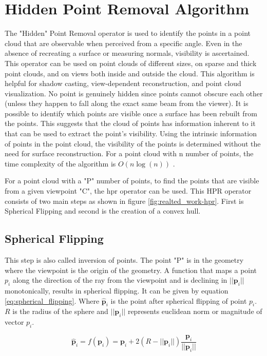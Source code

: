 \section{Hidden Point Removal Algorithm}
The "Hidden" Point Removal operator \parencite{katz2007}is used to identify the points in a point cloud that are observable when perceived from a specific angle. Even in the absence of recreating a surface or measuring normals, visibility is ascertained.  This operator can be used on point clouds of different sizes, on sparse and thick point clouds, and on views both inside and outside the cloud. This algorithm is helpful for shadow casting, view-dependent reconstruction, and point cloud visualization. No point is genuinely hidden since points cannot obscure each other (unless they happen to fall along the exact same beam from the viewer). It is possible to identify which points are visible once a surface has been rebuilt from the points. This suggests that the cloud of points has information inherent to it that can be used to extract the point's visibility. Using the intrinsic information of points in the point cloud, the visibility of the points is determined without the need for surface reconstruction. For a point cloud with n number of points, the time complexity of the algorithm is \(O(n\log(n))\) \parencite{katz2007}.

For a point cloud with a "P" number of points, to find the points that are visible from a given viewpoint "C", the \acrshort{hpr} operator can be used. This HPR operator consists of two main steps as shown in figure \ref{fig:realted_work-hpr}. First is Spherical Flipping and second is the creation of a convex hull. 

\subsection{Spherical Flipping}
This step is also called inversion of points. The point "P" is in the geometry where the viewpoint is the origin of the geometry. A function that maps a point \(p_i\) along the direction of the ray from the viewpoint and is declining in \(||\mathbf{p}_i||\) monotonically, results in spherical flipping. It can be given by equation \ref{eq:spherical_flipping}. Where \(\hat{\mathbf{p}}_i \) is the point after spherical flipping of point \(p_i\). \(R\) is the radius of the sphere and \(||\mathbf{p}_i||\) represents euclidean norm or magnitude of vector \(p_i\).

\begin{equation}\label{eq:spherical_flipping}
\hat{\mathbf{p}}_i = f(\mathbf{p}_i) = \mathbf{p}_i + 2(R - ||\mathbf{p}_i||) \frac{\mathbf{p}_i}{||\mathbf{p}_i||}
\end{equation}


